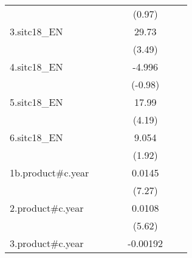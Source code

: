 {\begin{tabular}{l*{6}{c}}
                    &                     &                     &                     &      (0.97)         &                     &                     \\
[1em]
3.sitc18\_EN         &                     &                     &                     &       29.73\sym{***}&                     &                     \\
                    &                     &                     &                     &      (3.49)         &                     &                     \\
[1em]
4.sitc18\_EN         &                     &                     &                     &      -4.996         &                     &                     \\
                    &                     &                     &                     &     (-0.98)         &                     &                     \\
[1em]
5.sitc18\_EN         &                     &                     &                     &       17.99\sym{***}&                     &                     \\
                    &                     &                     &                     &      (4.19)         &                     &                     \\
[1em]
6.sitc18\_EN         &                     &                     &                     &       9.054         &                     &                     \\
                    &                     &                     &                     &      (1.92)         &                     &                     \\
[1em]
1b.product#c.year   &                     &                     &                     &      0.0145\sym{***}&                     &                     \\
                    &                     &                     &                     &      (7.27)         &                     &                     \\
[1em]
2.product#c.year    &                     &                     &                     &      0.0108\sym{***}&                     &                     \\
                    &                     &                     &                     &      (5.62)         &                     &                     \\
[1em]
3.product#c.year    &                     &                     &                     &    -0.00192         &                     &                     \\

\end{tabular}}
